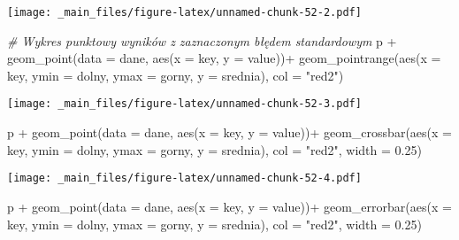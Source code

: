 \documentclass[
]{book}
\newenvironment{Shaded}{\begin{snugshade}}{\end{snugshade}}
\newcommand{\AttributeTok}[1]{\textcolor[rgb]{0.77,0.63,0.00}{#1}}
\newcommand{\CommentTok}[1]{\textcolor[rgb]{0.56,0.35,0.01}{\textit{#1}}}
\newcommand{\FloatTok}[1]{\textcolor[rgb]{0.00,0.00,0.81}{#1}}
\newcommand{\FunctionTok}[1]{\textcolor[rgb]{0.00,0.00,0.00}{#1}}
\newcommand{\NormalTok}[1]{#1}
\newcommand{\SpecialCharTok}[1]{\textcolor[rgb]{0.00,0.00,0.00}{#1}}
\newcommand{\StringTok}[1]{\textcolor[rgb]{0.31,0.60,0.02}{#1}}
\begin{document}
\texttt{[image: \_main\_files/figure-latex/unnamed-chunk-52-2.pdf]}

\begin{Shaded}
\begin{Highlighting}[]
\CommentTok{\# Wykres punktowy wyników z zaznaczonym błędem standardowym}
\NormalTok{p }\SpecialCharTok{+} \FunctionTok{geom\_point}\NormalTok{(}\AttributeTok{data =}\NormalTok{ dane, }\FunctionTok{aes}\NormalTok{(}\AttributeTok{x =}\NormalTok{ key, }\AttributeTok{y =}\NormalTok{ value))}\SpecialCharTok{+}
  \FunctionTok{geom\_pointrange}\NormalTok{(}\FunctionTok{aes}\NormalTok{(}\AttributeTok{x =}\NormalTok{ key, }\AttributeTok{ymin =}\NormalTok{ dolny, }\AttributeTok{ymax =}\NormalTok{ gorny, }\AttributeTok{y =}\NormalTok{ srednia), }\AttributeTok{col =} \StringTok{"red2"}\NormalTok{)}
\end{Highlighting}
\end{Shaded}

\texttt{[image: \_main\_files/figure-latex/unnamed-chunk-52-3.pdf]}

\begin{Shaded}
\begin{Highlighting}[]
\NormalTok{p }\SpecialCharTok{+} \FunctionTok{geom\_point}\NormalTok{(}\AttributeTok{data =}\NormalTok{ dane, }\FunctionTok{aes}\NormalTok{(}\AttributeTok{x =}\NormalTok{ key, }\AttributeTok{y =}\NormalTok{ value))}\SpecialCharTok{+}
  \FunctionTok{geom\_crossbar}\NormalTok{(}\FunctionTok{aes}\NormalTok{(}\AttributeTok{x =}\NormalTok{ key, }\AttributeTok{ymin =}\NormalTok{ dolny, }\AttributeTok{ymax =}\NormalTok{ gorny, }\AttributeTok{y =}\NormalTok{ srednia), }\AttributeTok{col =} \StringTok{"red2"}\NormalTok{, }\AttributeTok{width =} \FloatTok{0.25}\NormalTok{)}
\end{Highlighting}
\end{Shaded}

\texttt{[image: \_main\_files/figure-latex/unnamed-chunk-52-4.pdf]}

\begin{Shaded}
\begin{Highlighting}[]
\NormalTok{p }\SpecialCharTok{+} \FunctionTok{geom\_point}\NormalTok{(}\AttributeTok{data =}\NormalTok{ dane, }\FunctionTok{aes}\NormalTok{(}\AttributeTok{x =}\NormalTok{ key, }\AttributeTok{y =}\NormalTok{ value))}\SpecialCharTok{+}
  \FunctionTok{geom\_errorbar}\NormalTok{(}\FunctionTok{aes}\NormalTok{(}\AttributeTok{x =}\NormalTok{ key, }\AttributeTok{ymin =}\NormalTok{ dolny, }\AttributeTok{ymax =}\NormalTok{ gorny, }\AttributeTok{y =}\NormalTok{ srednia), }\AttributeTok{col =} \StringTok{"red2"}\NormalTok{, }\AttributeTok{width =} \FloatTok{0.25}\NormalTok{)}
\end{Highlighting}
\end{Shaded}
\end{document}
